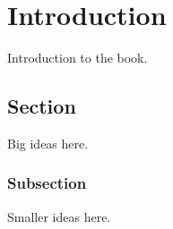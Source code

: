 \chapter{Introduction}
\label{introduction}

Introduction to the book.
\section{Section}
Big ideas here.
\subsection{Subsection}
Smaller ideas here.



  